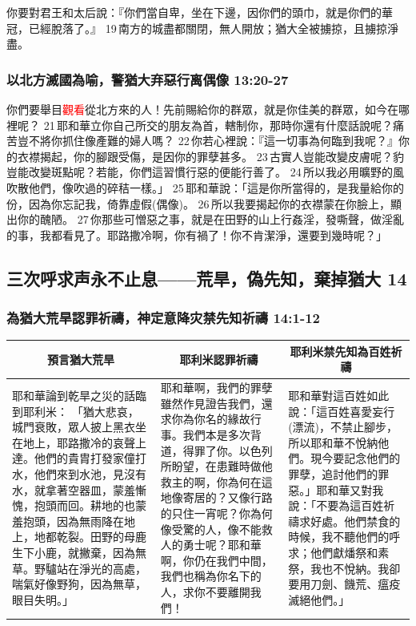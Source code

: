 你要對君王和太后說：『你們當自卑，坐在下邊，因你們的頭巾，就是你們的華冠，已經脫落了。』 19 南方的城盡都關閉，無人開放；猶大全被擄掠，且擄掠淨盡。

\subsubsection{以北方滅國為喻，警猶大弃惡行离偶像 13:20-27}
你們要舉目\textcolor{red}{觀看}從北方來的人！先前賜給你的群眾，就是你佳美的群眾，如今在哪裡呢？ 21 耶和華立你自己所交的朋友為首，轄制你，那時你還有什麼話說呢？痛苦豈不將你抓住像產難的婦人嗎？ 22 你若心裡說：『這一切事為何臨到我呢？』你的衣襟揭起，你的腳跟受傷，是因你的罪孽甚多。 23 古實人豈能改變皮膚呢？豹豈能改變斑點呢？若能，你們這習慣行惡的便能行善了。 24 所以我必用曠野的風吹散他們，像吹過的碎秸一樣。」 
25 耶和華說：「這是你所當得的，是我量給你的份，因為你忘記我，倚靠虛假(偶像)。 26 所以我要揭起你的衣襟蒙在你臉上，顯出你的醜陋。 27 你那些可憎惡之事，就是在田野的山上行姦淫，發嘶聲，做淫亂的事，我都看見了。耶路撒冷啊，你有禍了！你不肯潔淨，還要到幾時呢？」


\subsection{三次呼求声永不止息——荒旱，偽先知，棄掉猶大 14}
\subsubsection{為猶大荒旱認罪祈禱，神定意降灾禁先知祈禱 14:1-12}
\begin{table}[H]
\centering
\begin{tabular}{p{6.25cm}|p{5.50cm}|p{5.2cm}}\hline\hline
\multicolumn{1}{c|}{預言猶大荒旱}&\multicolumn{1}{c|}{耶利米認罪祈禱}&\multicolumn{1}{c}{耶利米禁先知為百姓祈禱}\\\hline
耶和華論到乾旱之災的話臨到耶利米：
「猶大悲哀，城門衰敗，眾人披上黑衣坐在地上，耶路撒冷的哀聲上達。他們的貴胄打發家僮打水，他們來到水池，見沒有水，就拿著空器皿，蒙羞慚愧，抱頭而回。耕地的也蒙羞抱頭，因為無雨降在地上，地都乾裂。田野的母鹿生下小鹿，就撇棄，因為無草。野驢站在淨光的高處，喘氣好像野狗，因為無草，眼目失明。」
&耶和華啊，我們的罪孽雖然作見證告我們，還求你為你名的緣故行事。我們本是多次背道，得罪了你。以色列所盼望，在患難時做他救主的啊，你為何在這地像寄居的？又像行路的只住一宵呢？你為何像受驚的人，像不能救人的勇士呢？耶和華啊，你仍在我們中間，我們也稱為你名下的人，求你不要離開我們！
&耶和華對這百姓如此說：「這百姓喜愛妄行(漂流)，不禁止腳步，所以耶和華不悅納他們。現今要記念他們的罪孽，追討他們的罪惡。」耶和華又對我說：「不要為這百姓祈禱求好處。他們禁食的時候，我不聽他們的呼求；他們獻燔祭和素祭，我也不悅納。我卻要用刀劍、饑荒、瘟疫滅絕他們。」\\\hline
\end{tabular}
\end{table}


